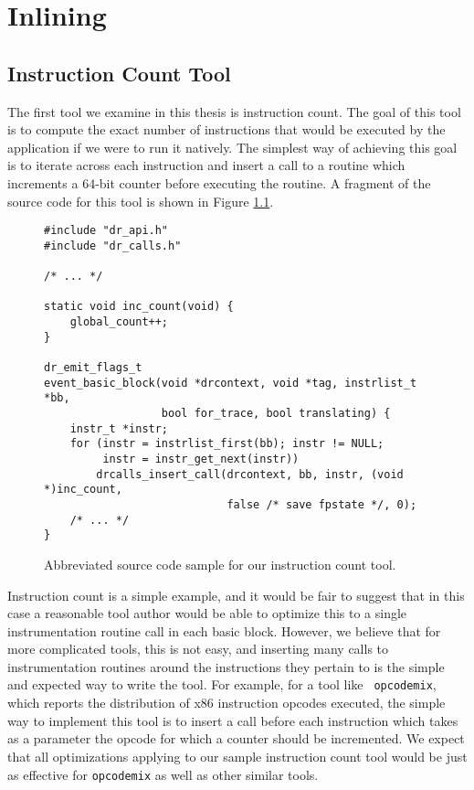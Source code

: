 \chapter{Inlining}
\label{sec:inlining}

\section{Instruction Count Tool}

The first tool we examine in this thesis is instruction count.  The goal of this
tool is to compute the exact number of instructions that would be executed by
the application if we were to run it natively.  The simplest way of achieving
this goal is to iterate across each instruction and insert a call to a routine
which increments a 64-bit counter before executing the routine.  A fragment of
the source code for this tool is shown in Figure \ref{fig:naive_inscount}.

\begin{figure}
\begin{verbatim}
#include "dr_api.h"
#include "dr_calls.h"

/* ... */

static void inc_count(void) {
    global_count++;
}

dr_emit_flags_t
event_basic_block(void *drcontext, void *tag, instrlist_t *bb,
                  bool for_trace, bool translating) {
    instr_t *instr;
    for (instr = instrlist_first(bb); instr != NULL;
         instr = instr_get_next(instr))
        drcalls_insert_call(drcontext, bb, instr, (void *)inc_count,
                            false /* save fpstate */, 0);
    /* ... */
}
\end{verbatim}
\caption{Abbreviated source code sample for our instruction count tool.}
\label{fig:naive_inscount}
\end{figure}

Instruction count is a simple example, and it would be fair to suggest that in
this case a reasonable tool author would be able to optimize this to a single
instrumentation routine call in each basic block.  However, we believe that for
more complicated tools, this is not easy, and inserting many calls to
instrumentation routines around the instructions they pertain to is the simple
and expected way to write the tool.  For example, for a tool like {\tt
opcodemix}, which reports the distribution of x86 instruction opcodes executed,
the simple way to implement this tool is to insert a call before each
instruction which takes as a parameter the opcode for which a counter should be
incremented.  We expect that all optimizations applying to our sample
instruction count tool would be just as effective for {\tt opcodemix} as well as
other similar tools.

